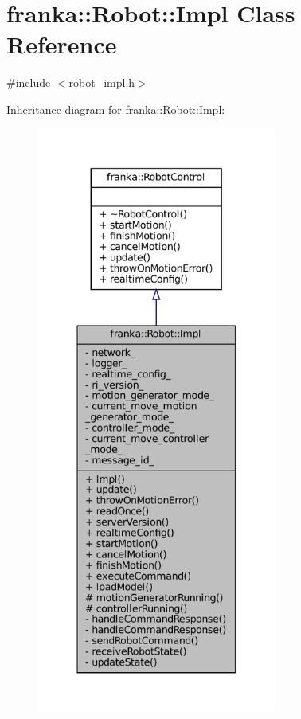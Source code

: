 \hypertarget{classfranka_1_1Robot_1_1Impl}{}\section{franka\+:\+:Robot\+:\+:Impl Class Reference}
\label{classfranka_1_1Robot_1_1Impl}


{\ttfamily \#include $<$robot\+\_\+impl.\+h$>$}



Inheritance diagram for franka\+:\+:Robot\+:\+:Impl\+:
\nopagebreak
\begin{figure}[H]
\begin{center}
\leavevmode
\includegraphics[height=550pt]{classfranka_1_1Robot_1_1Impl__inherit__graph}
\end{center}
\end{figure}


